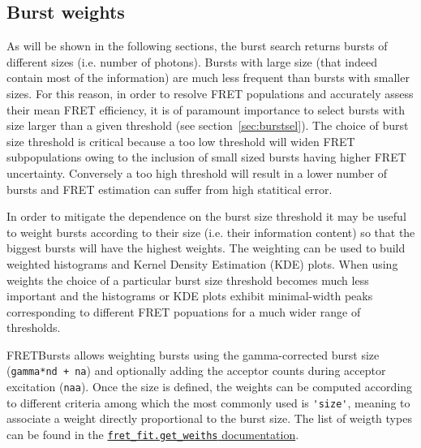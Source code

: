\subsection{Burst weights}
As will be shown in the following sections, the burst search returns bursts of different sizes (i.e. number of photons). 
Bursts with large size (that indeed contain most of the information) 
are much less frequent than bursts with smaller sizes. For this reason, in order 
to resolve FRET populations and accurately assess their mean FRET efficiency, it is of
paramount importance to select bursts with size larger than a given threshold (see 
section~\ref{sec:burstsel}). The choice of burst size threshold is 
critical because a too low threshold will widen FRET subpopulations owing to the 
inclusion of small sized bursts having higher FRET uncertainty. Conversely 
a too high threshold will result in a lower number of bursts and FRET estimation 
can suffer from high statitical error.

In order to mitigate the dependence on the burst size threshold it may be 
useful to weight bursts according to their size (i.e. their 
information content) so that the biggest bursts will have the highest weights. 
The weighting can be used to build weighted histograms and Kernel Density Estimation (KDE) plots.
When using weights the choice of a particular burst size threshold becomes 
much less important and the histograms or KDE plots exhibit minimal-width
peaks corresponding to different FRET popuations for a much wider range
of thresholds. 

FRETBursts allows weighting bursts using the gamma-corrected burst size
(\verb|gamma*nd + na|) and optionally adding the acceptor counts during
acceptor excitation (\verb|naa|). Once the size is defined, the weights
can be computed according to different criteria among which the most
commonly used is \verb|'size'|, meaning to associate a weight 
directly proportional to the burst size. The list of weigth types
can be found in the 
\href{http://fretbursts.readthedocs.org/en/latest/fret_fit.html#fretbursts.fret_fit.get_weights}{\texttt{fret\_fit.get\_weiths} documentation}.

